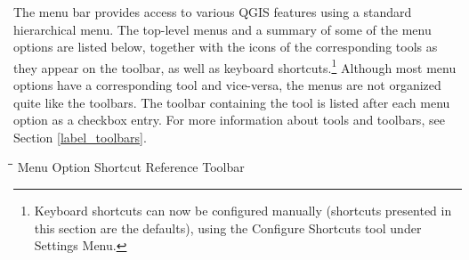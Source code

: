 The menu bar provides access to various QGIS features using a standard
hierarchical menu. The top-level menus and a summary of some of the
menu options are listed below, together with the icons of the corresponding
tools as they appear on the toolbar, as well as keyboard
shortcuts.\footnote{Keyboard shortcuts can now be configured manually
(shortcuts presented in this section are the defaults), using the Configure
Shortcuts tool under Settings Menu.}
Although most menu options have a corresponding tool and vice-versa,
the menus are not organized quite like the toolbars.
The toolbar containing the tool is listed after each menu option as a checkbox
entry. For more information about tools and toolbars, see Section
\ref{label_toolbars}.

\begin{tabbing}
\hspace{5.5cm}\=\hspace{3cm}\=\hspace{3.5cm}\= \kill
\hspace{1cm} Menu Option \> Shortcut \> Reference \> Toolbar\\
\end{tabbing}

